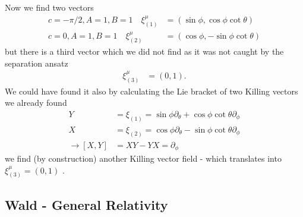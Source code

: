\documentclass[10pt,a4paper]{book}
\theoremstyle{definition}
\begin{document}
Now we find two vectors
\begin{align}
c=-\pi/2, A=1, B=1\quad \xi^\mu_{(1)}&=(\sin\phi,\cos\phi\cot\theta)\\
c=0, A=1, B=1\quad \xi^\mu_{(2)}&=(\cos\phi,-\sin\phi\cot\theta)
\end{align}
but there is a third vector which we did not find as it was not caught by the separation ansatz
\begin{align}
\xi^\mu_{(3)}&=(0,1).
\end{align}
We could have found it also by calculating the Lie bracket of two Killing vectors we already found
\begin{align}
Y&=\xi_{(1)}=\sin\phi\partial_\theta+\cos\phi\cot\theta\partial_\phi\\
X&=\xi_{(2)}=\cos\phi\partial_\theta-\sin\phi\cot\theta\partial_\phi\\
\rightarrow[X,Y]&=XY-YX=\partial_\phi
\end{align}
we find (by construction) another Killing vector field - which translates into $\xi^\mu_{(3)}=(0,1)$ .

\subsection{{\sc Wald} - General Relativity}
\end{document}
